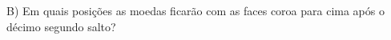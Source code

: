 \documentclass[preview]{standalone}
\begin{document}
\begin{center}
B) Em quais posições as moedas ficarão com as faces coroa para cima após o décimo segundo salto?
\end{center}
\end{document}
